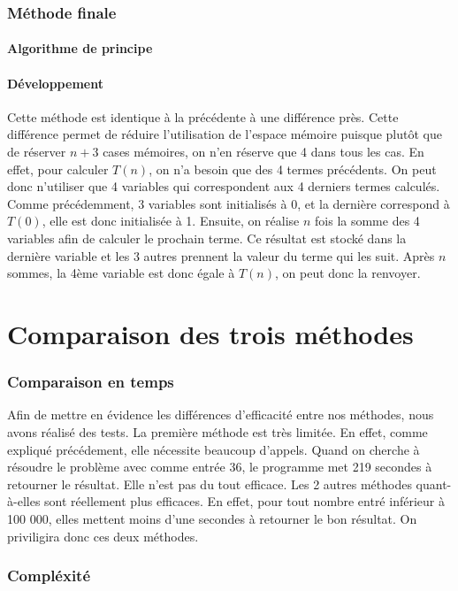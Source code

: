 \documentclass{article}
\begin{document}
\section{Méthode finale}

\subsection{Algorithme de principe}


\subsection{Développement}
Cette méthode est identique à la précédente à une différence près. Cette différence permet de réduire l'utilisation de l'espace mémoire puisque plutôt que de réserver $n+3$ cases mémoires, on n'en réserve que 4 dans tous les cas. En effet, pour calculer $T(n)$, on n'a besoin que des 4 termes précédents. On peut donc n'utiliser que 4 variables qui correspondent aux 4 derniers termes calculés. Comme précédemment, 3 variables sont initialisés à 0, et la dernière correspond à $T(0)$, elle est donc initialisée à 1. Ensuite, on réalise $n$ fois la somme des 4 variables afin de calculer le prochain terme. Ce résultat est stocké dans la dernière variable et les 3 autres prennent la valeur du terme qui les suit. Après $n$ sommes, la 4ème variable est donc égale à $T(n)$, on peut donc la renvoyer.
\newpage
\part{Comparaison des trois méthodes}
\section{Comparaison en temps}
Afin de mettre en évidence les différences d'efficacité entre nos méthodes, nous avons réalisé des tests. La première méthode est très limitée. En effet, comme expliqué précédement, elle nécessite beaucoup d'appels. Quand on cherche à résoudre le problème avec comme entrée 36, le programme met 219 secondes à retourner le résultat. Elle n'est pas du tout efficace. Les 2 autres méthodes quant-à-elles sont réellement plus efficaces. En effet, pour tout nombre entré inférieur à 100 000, elles mettent moins d'une secondes à retourner le bon résultat. On priviligira donc ces deux méthodes.

\section{Compléxité}
\end{document}
